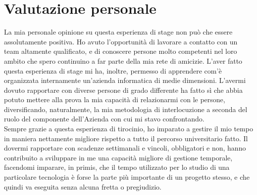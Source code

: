\section{Valutazione personale}
La mia personale opinione su questa esperienza di stage non può che essere assolutamente positiva. Ho avuto l'opportunità di lavorare a contatto con un team altamente qualificato, e di conoscere persone molto competenti nel loro ambito che spero continuino a far parte della mia rete di amicizie. L'aver fatto questa esperienza di stage mi ha, inoltre, permesso di apprendere com'è organizzata internamente un'azienda informatica di medie dimensioni. L'avermi dovuto rapportare con diverse persone di grado differente ha fatto sì che abbia potuto mettere alla prova la mia capacità di relazionarmi con le persone, diversificando, naturalmente, la mia metodologia di interlocuzione a seconda del ruolo del componente dell'Azienda con cui mi stavo confrontando.\\
Sempre grazie a questa esperienza di tirocinio, ho imparato a gestire il mio tempo in maniera nettamente migliore rispetto a tutto il percorso universitario fatto. Il dovermi rapportare con scadenze settimanali e vincoli, obbligatori e non, hanno contribuito a sviluppare in me una capacità migliore di gestione temporale, facendomi imparare, in primis, che il tempo utilizzato per lo studio di una particolare tecnologia è forse la parte più importante di un progetto stesso, e che quindi va eseguita senza alcuna fretta o pregiudizio.







